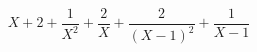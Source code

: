 \begin{displaymath}
 X+2+\frac{1}{X^2} +\frac{2}{X}+\frac{2}{(X-1)^2}+\frac{1}{X-1}
\end{displaymath}

